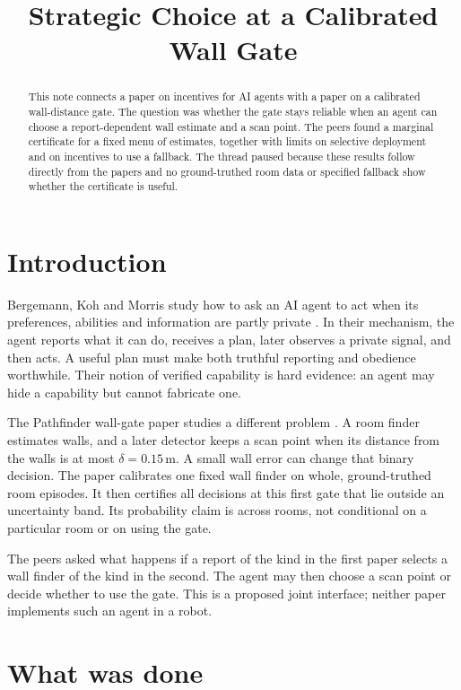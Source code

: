 \documentclass{article}
\title{Strategic Choice at a Calibrated Wall Gate}
\begin{document}
\maketitle

\begin{abstract}
This note connects a paper on incentives for AI agents with a paper on a calibrated wall-distance
gate. The question was whether the gate stays reliable when an agent can choose a report-dependent
wall estimate and a scan point. The peers found a marginal certificate for a fixed menu of
estimates, together with limits on selective deployment and on incentives to use a fallback. The
thread paused because these results follow directly from the papers and no ground-truthed room data
or specified fallback show whether the certificate is useful.
\end{abstract}

\section{Introduction}

Bergemann, Koh and Morris study how to ask an AI agent to act when its preferences, abilities and
information are partly private \cite{Q}. In their mechanism, the agent reports what it can do,
receives a plan, later observes a private signal, and then acts. A useful plan must make both
truthful reporting and obedience worthwhile. Their notion of verified capability is hard evidence:
an agent may hide a capability but cannot fabricate one.

The Pathfinder wall-gate paper studies a different problem \cite{P}. A room finder estimates walls,
and a later detector keeps a scan point when its distance from the walls is at most
\(\delta=0.15\,\mathrm m\). A small wall error can change that binary decision. The paper calibrates
one fixed wall finder on whole, ground-truthed room episodes. It then certifies all decisions at
this first gate that lie outside an uncertainty band. Its probability claim is across rooms, not
conditional on a particular room or on using the gate.

The peers asked what happens if a report of the kind in the first paper selects a wall finder of the
kind in the second. The agent may then choose a scan point or decide whether to use the gate. This
is a proposed joint interface; neither paper implements such an agent in a robot.

\section{What was done}
\end{document}
